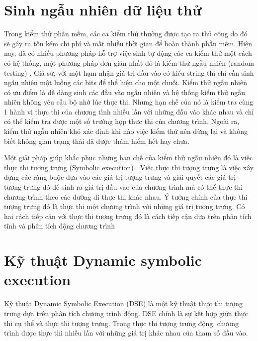 \section{Sinh ngẫu nhiên dữ liệu thử}


	Trong kiểm thử phần mềm, các ca kiểm thử thường được tạo ra thủ công do đó sẽ gây ra tốn kém chi phí và mất nhiều thời gian để hoàn thành phần mềm. Hiện nay, đã có nhiều phương pháp hỗ trợ việc sinh tự động các ca kiểm thử một cách có hệ thống, một phương pháp đơn giản nhất đó là kiểm thử ngẫu nhiên (random testing) \cite{zhu1997software}. Giả sử, với một hạm nhận giá trị đầu vào có kiểu string thì chỉ cần sinh ngẫu nhiên một luồng các bits để thể hiện cho một chuỗi. Kiểm thử ngẫu nhiên có ưu điểm là dễ dàng sinh các đầu vào ngẫu nhiên và hệ thống kiểm thử ngẫu nhiên không yêu cầu bộ nhớ lúc thực thi. Nhưng hạn chế của nó là kiểm tra cùng 1 hành vi thực thi của chương tình nhiều lần với những đầu vào khác nhau và chỉ có thể kiểm tra được một số trường hợp thực thi của chương trình. Ngoài ra, kiểm thử ngẫu nhiên khó xác định khi nào việc kiểm thử nên dừng lại và không biết không gian trạng thái đã được thám hiểm hết hay chưa.
	
	Một giải pháp giúp khắc phục những hạn chế của kiểm thử ngẫu nhiên đó là việc thực thi tượng trưng (Symbolic execution) \cite{king1976symbolic}. Việc thực thi tượng trưng là việc xây dựng các ràng buộc dựa vào các giá trị tượng trưng và giải quyết các giá trị tương trưng đó để sinh ra giá trị đầu vào của chương trình mà có thể thực thi chương trình theo các đường đi thực thi khác nhau. Ý tưởng chính của thực thi tượng trưng đó là thực thi một chương trình với những giá trị tượng trưng. Có hai cách tiếp cận với thực thi tượng trưng đó là cách tiếp cận dựa trên phân tích tĩnh và phân tích động chương trình


\section{Kỹ thuật Dynamic symbolic execution}

	Kỹ thuật Dynamic Symbolic Execution (DSE) \cite{xie2009fitness} là một kỹ thuật thực thi tượng trưng dựa trên phân tích chương trình động. DSE chính là sự kết hợp giữa thực thi cụ thể và thực thi tượng trưng. Trong thực thi tượng trưng động, chương trình được thực thi nhiều lần với những giá trị khác nhau của tham số đầu vào.

